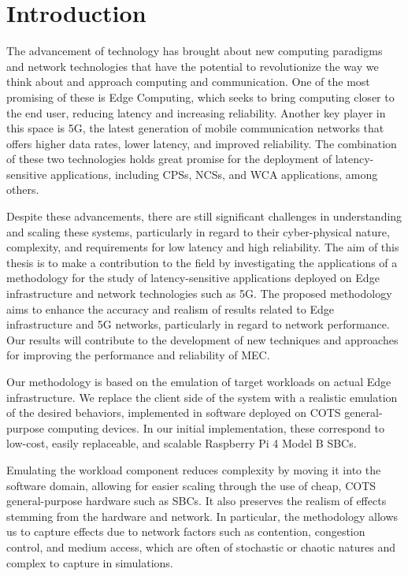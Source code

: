 \section{Introduction}

The advancement of technology has brought about new computing paradigms and network technologies that have the potential to revolutionize the way we think about and approach computing and communication.
One of the most promising of these is Edge Computing, which seeks to bring computing closer to the end user, reducing latency and increasing reliability.
Another key player in this space is 5G, the latest generation of mobile communication networks that offers higher data rates, lower latency, and improved reliability.
The combination of these two technologies holds great promise for the deployment of latency-sensitive applications, including \glspl{CPS}, \glspl{NCS}, and \gls{WCA} applications, among others.

Despite these advancements, there are still significant challenges in understanding and scaling these systems, particularly in regard to their cyber-physical nature, complexity, and requirements for low latency and high reliability.
The aim of this thesis is to make a contribution to the field by investigating the applications of a methodology for the study of latency-sensitive applications deployed on Edge infrastructure and network technologies such as 5G.
The proposed methodology aims to enhance the accuracy and realism of results related to Edge infrastructure and 5G networks, particularly in regard to network performance.
Our results will contribute to the development of new techniques and approaches for improving the performance and reliability of \gls{MEC}.

Our methodology is based on the emulation of target workloads on actual Edge infrastructure.
We replace the client side of the system with a realistic emulation of the desired behaviors, implemented in software deployed on \gls{COTS} general-purpose computing devices.
In our initial implementation, these correspond to low-cost, easily replaceable, and scalable Raspberry Pi 4 Model B \glspl{SBC}.

Emulating the workload component reduces complexity by moving it into the software domain, allowing for easier scaling through the use of cheap, COTS general-purpose hardware such as \glspl{SBC}.
It also preserves the realism of effects stemming from the hardware and network.
In particular, the methodology allows us to capture effects due to network factors such as contention, congestion control, and medium access, which are often of stochastic or chaotic natures and complex to capture in simulations.

